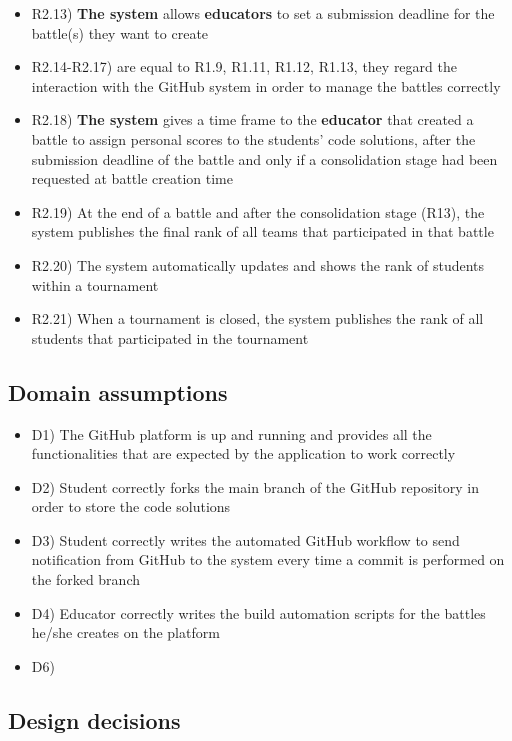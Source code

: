 \begin{itemize}
\begin{itemize}
			\item R2.13) \textbf{The system} allows \textbf{educators} to set a submission deadline for the battle(s) they want to create
			\item R2.14-R2.17) are equal to R1.9, R1.11, R1.12, R1.13, they regard the interaction with the GitHub system in order to manage the battles correctly
			\item R2.18) \textbf{The system} gives a time frame to the \textbf{educator} that created a battle to assign personal scores to the students’ code solutions, after the submission deadline of the battle and only if a consolidation stage had been requested at battle creation time
			\item R2.19) At the end of a battle and after the consolidation stage (R13), the system publishes the final rank of all teams that participated in that battle
			\item R2.20) The system automatically updates and shows the rank of students within a tournament
			\item R2.21) When a tournament is closed, the system publishes the rank of all students that participated in the tournament
		\end{itemize}
	\end{itemize}
	
	\subsection{Domain assumptions}
	\begin{itemize}
		\item D1) The GitHub platform is up and running and provides all the functionalities that are expected by the application to work correctly
		\item D2) Student correctly forks the main branch of the GitHub repository in order to store the code solutions
		\item D3) Student correctly writes the automated GitHub workflow to send notification from GitHub to the system every time a commit is performed on the forked branch
		\item D4) Educator correctly writes the build automation scripts for the battles he/she creates on the platform
		\item D6) 
	\end{itemize}
	
	\subsection{Design decisions}
